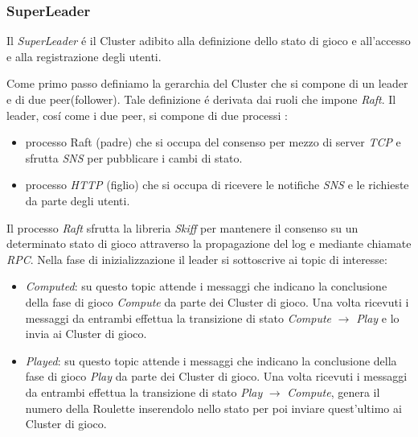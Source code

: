 \documentclass{sig-alternate-05-2015}
\begin{document}
\subsubsection{SuperLeader}


Il \textit{SuperLeader} \'e il Cluster adibito alla definizione dello stato di gioco e all'accesso e alla registrazione degli utenti.

Come primo passo definiamo la gerarchia del Cluster che si compone di un leader e di due peer(follower).
Tale definizione \'e derivata dai ruoli che impone \textit{Raft}.
Il leader, cos\'i come i due peer, si compone di due processi :
\begin{itemize}
\item processo Raft (padre) che si occupa del consenso per mezzo di server \textit{TCP} e sfrutta \textit{SNS} per pubblicare i cambi di stato.
\item processo \textit{HTTP} (figlio) che si occupa di ricevere le notifiche \textit{SNS} e le richieste da parte degli utenti.
\end{itemize}

Il processo \textit{Raft} sfrutta la libreria \textit{Skiff} per mantenere il consenso su un determinato stato di gioco attraverso la propagazione del log e mediante chiamate \textit{RPC}.
Nella fase di inizializzazione il leader si sottoscrive ai topic di interesse:
\begin{itemize}
\item \textit{Computed}: su questo topic attende i messaggi che indicano la conclusione della fase di gioco \textit{Compute} da parte dei Cluster di gioco. Una volta ricevuti i messaggi da entrambi effettua la transizione di stato \textit{Compute} $\rightarrow$ \textit{Play} e lo invia ai Cluster di gioco. 
\item \textit{Played}: su questo topic attende i messaggi che indicano la conclusione della fase di gioco \textit{Play} da parte dei Cluster di gioco. Una volta ricevuti i messaggi da entrambi effettua la transizione di stato \textit{Play} $\rightarrow$  \textit{Compute},  genera il numero della Roulette inserendolo nello stato per poi inviare quest'ultimo ai Cluster di gioco.
\end{itemize}
\end{document}
